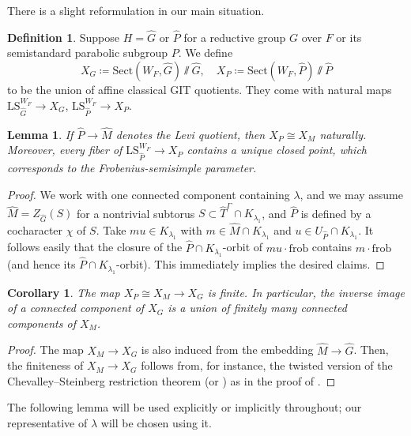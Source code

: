 \documentclass{amsart}
\newtheorem{lemma}[theorem]{Lemma}
\newtheorem{corollary}[theorem]{Corollary}
\theoremstyle{definition}
\newtheorem{definition}[theorem]{Definition}
\theoremstyle{remark}
\numberwithin{equation}{section}
\newcommand{\wh}{\widehat}
\newcommand{\frob}{\mathrm{frob}}
\newcommand{\LS}{\mathrm{LS}}
\newcommand{\Sect}{\mathrm{Sect}}
\begin{document}
There is a slight reformulation in our main situation. 

\begin{definition}
Suppose $H=\wh G$ or $\wh P$ for a reductive group $G$ over $F$ or its semistandard parabolic subgroup $P$.
We define 
\[
X_G\coloneq \Sect(W_F, \wh G) \sslash \wh G, \quad X_P\coloneq \Sect(W_F, \wh P) \sslash \wh P
\]
to be the union of affine classical GIT quotients. They come with natural maps $\LS_{\wh G}^{W_F}\to X_G$, $\LS_{\wh P}^{W_F}\to X_P$.  
\end{definition}

\begin{lemma}\label{lem: X_P=X_M}
If $\wh P\to \wh M$ denotes the Levi quotient, then $X_P\cong X_M$ naturally. Moreover, every fiber of $\LS_{\wh P}^{W_F}\to X_P$ contains a unique closed point, which corresponds to the Frobenius-semisimple parameter.   
\end{lemma}

\begin{proof}
We work with one connected component containing $\lambda$, and we may assume $\wh M=Z_{\wh G}(S)$ for a nontrivial subtorus $S\subset \wh{T}^{\Gamma}\cap  K_{\lambda_1}$, and $\wh P$ is defined by a cocharacter $\chi$ of $S$. Take $mu\in K_{\lambda_1}$ with $m\in \wh M\cap K_{\lambda_1}$ and $u\in U_{\wh P}\cap K_{\lambda_1}$. It follows easily that the closure of the $\wh P \cap K_{\lambda_1}$-orbit of $mu\cdot \frob$ contains $m\cdot \frob$ (and hence its $\wh P \cap K_{\lambda_1}$-orbit). This immediately implies the desired claims. 
\end{proof}

\begin{corollary}\label{cor: XP to GG is finite}
The map $X_P\cong X_M\to X_G$ is finite. In particular, the inverse image of a connected component of $X_G$ is a union of finitely many connected components of $X_M$. 
\end{corollary}

\begin{proof}
The map $X_M\to X_G$ is also induced from the embedding $\wh{M}\to \wh{G}$. Then, the finiteness of $X_M\to X_G$ follows from, for instance, the twisted version of the Chevalley--Steinberg restriction theorem \cite[Theorem 1.1]{Mohrdieck} (or \cite[Proposition 6.6]{DHKM}) as in the proof of \cite[Theorem 2.3]{DHKMfiniteness}.  
\end{proof}

The following lemma will be used explicitly or implicitly throughout; our representative of $\lambda$ will be chosen using it. 
\end{document}
